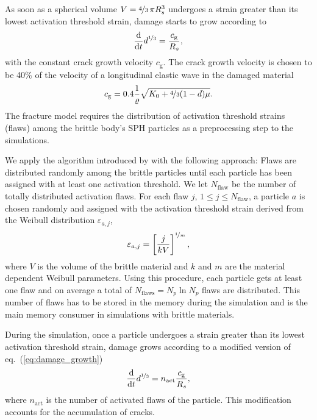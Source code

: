 \documentclass[10pt,fleqn,twoside]{article}
\begin{document}
As soon as a spherical volume $V= \nicefrac{4}{3} \, \pi R_s^3$ undergoes a strain greater than its lowest activation threshold
strain, damage starts to grow according to
%
\begin{equation}
\label{eq:damage_growth}
\frac{\mathrm{d}}{\mathrm{d}t} d^{\nicefrac{1}{3}} = \frac{c_\mathrm{g}}{R_s},
\end{equation}
%
with the constant crack growth velocity $c_\mathrm{g}$. The crack growth velocity is chosen to be 40\% of the velocity of
a longitudinal elastic wave in the damaged material
%
\begin{equation}
c_\mathrm{g} = \num{0.4} \frac{1}{\varrho} \sqrt{ K_0 + \nicefrac{4}{3} (1-d) \mu}.
\end{equation}
%
The fracture model requires the distribution of activation threshold strains (flaws) among the brittle body's SPH particles as a preprocessing step to the simulations.
%

We apply the algorithm introduced by \cite{benz:1995} with the following approach: Flaws
are distributed randomly among the brittle particles until each particle has been assigned with at least one activation
threshold. We let $N_\mathrm{flaw}$ be the number of totally distributed activation flaws. For each flaw $j$, $1\leq j \leq
N_\mathrm{flaw}$, a particle $a$ is chosen randomly and assigned with the activation threshold strain derived from the
Weibull distribution $\varepsilon_{a,j}$,
%
\begin{equation}
\varepsilon_{a,j} = \left[ \frac{j}{kV} \right]^{\nicefrac{1}{m}},
\end{equation}
%
where $V$ is the volume of the brittle material and $k$ and $m$ are the material dependent Weibull parameters. Using
this procedure, each particle gets at least one flaw and on average a total of $N_\mathrm{flaws} = N_p \ln N_p$ flaws
are distributed. This number of flaws has to be stored in the memory during the simulation and is the
main memory consumer in simulations with brittle materials.


During the simulation, once a particle undergoes a strain greater than its lowest activation threshold strain, damage
grows according to a modified version of eq.~(\ref{eq:damage_growth})
%
\begin{equation}
\frac{\mathrm{d}}{\mathrm{d} t} d^{\nicefrac{1}{3}} = n_\mathrm{act} \frac{c_\mathrm{g}}{R_s},
\end{equation}
%
where $n_\mathrm{act}$ is the number of activated flaws of the particle. This modification accounts for the accumulation
of cracks.
\end{document}
